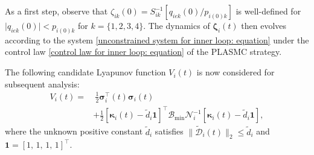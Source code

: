 \documentclass[lettersize,journal]{IEEEtran}
\begin{document}
As a first step, observe that $\zeta_{i k}(0) = S_{i k}^{-1} [q_{ie k}(0) / p_{i (0) k}]$ is well-defined for $\lvert q_{ie k}(0) \rvert < p_{i (0) k}$ for $k = \{1, 2, 3, 4\}$. The dynamics of $\boldsymbol{\zeta}_i(t)$ then evolves according to the system \eqref{unconstrained system for inner loop: equation} under the control law \eqref{control law for inner loop: equation} of the PLASMC strategy.

\noindent The following candidate Lyapunov function $V_i(t)$ is now considered for subsequent analysis:
\begin{align} \label{Lyapunov function for inner loop: equation}
    V_i(t) =&~ \frac{1}{2}\boldsymbol{\sigma}_i^{\top}(t)\boldsymbol{\sigma}_i(t) \nonumber \\
    &+ \frac{1}{2} \left[\boldsymbol{\kappa}_i(t) - \tilde{d}_{i} \boldsymbol{1}\right]^{\top} \mathcal{B}_{\text{min}} \mathcal{N}_i^{-1} \left[\boldsymbol{\kappa}_i(t) - \tilde{d}_{i} \boldsymbol{1}\right],
\end{align}
where the unknown positive constant $\tilde{d}_{i}$ satisfies $\lVert\tilde{\mathcal{D}}_i(t)\rVert_2 \leq \tilde{d}_i$ and $\boldsymbol{1} = [1,\,1,\,1,\,1]^{\top}$.
\end{document}
